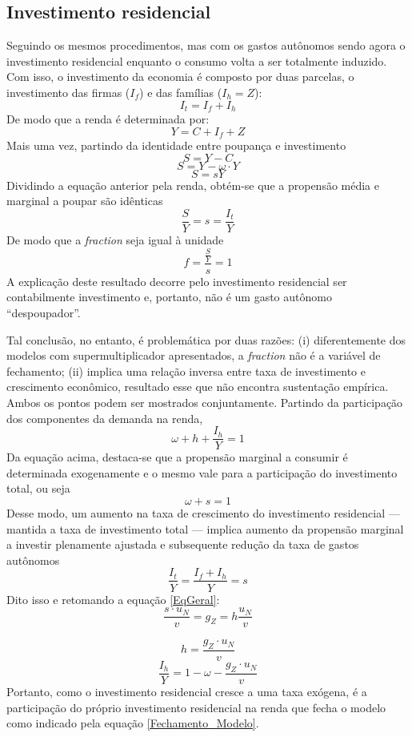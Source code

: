 \subsection{Investimento residencial}

Seguindo os mesmos procedimentos, mas com os gastos autônomos sendo agora o investimento residencial enquanto o consumo volta a ser totalmente induzido. Com isso, o investimento da economia é composto por duas parcelas, o investimento das firmas ($I_f$) e das famílias ($I_h = Z$):
$$
I_t = I_f + I_h
$$
De modo que a renda é determinada por:
$$
Y = C + I_f + Z
$$
Mais uma vez, partindo da identidade entre poupança e investimento
$$
S = Y - C
$$
$$
S = Y -  \omega\cdot Y
$$
$$
S = sY
$$
Dividindo a equação anterior pela renda, obtém-se que a propensão média e marginal a poupar são idênticas
$$
\frac{S}{Y} = s = \frac{I_t}{Y}
$$
De modo que a \textit{fraction} seja igual à unidade
$$
f = \frac{\frac{S}{Y}}{s} = 1
$$
A explicação deste resultado decorre pelo investimento residencial ser contabilmente investimento e, portanto, não é um gasto autônomo ``despoupador''. 

Tal conclusão, no entanto, é problemática por duas razões: (i) diferentemente dos modelos com supermultiplicador apresentados, a \textit{fraction} não é a variável de fechamento; (ii) implica uma relação inversa entre taxa de investimento e crescimento econômico, resultado esse que não encontra sustentação empírica. Ambos os pontos podem ser mostrados conjuntamente. Partindo da participação dos componentes da demanda na renda,
$$
\omega + h + \frac{I_h}{Y} = 1
$$
Da equação acima, destaca-se que a propensão marginal a consumir é determinada exogenamente e o mesmo vale para a participação do investimento total, ou seja
$$
 \omega +  s = 1
$$
Desse modo, um aumento na taxa de crescimento do investimento residencial --- mantida a taxa de investimento total --- implica aumento da propensão marginal a investir plenamente ajustada e subsequente redução da taxa de gastos autônomos
$$
\frac{I_t}{Y} = \frac{I_f + I_h}{Y} = s
$$
Dito isso e retomando a equação \ref{EqGeral}:
$$
\frac{ s\cdot  u_N}{v} =  g_Z = h\frac{ u_N}{ v}
$$

\begin{equation}
h = \frac{ g_Z\cdot  u_N}{ v}
\end{equation}
\begin{equation}
    \label{Fechamento_Modelo}
\frac{I_h}{Y} = 1 - \omega - \frac{ g_Z\cdot  u_N}{ v}
\end{equation}
Portanto, como o investimento residencial cresce a uma taxa exógena, é a participação do próprio investimento residencial na renda que fecha o modelo como indicado pela equação \ref{Fechamento_Modelo}. 

